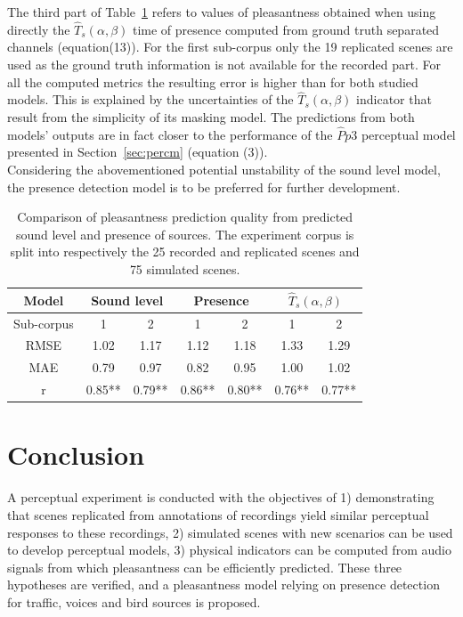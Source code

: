 \documentclass[11pt,a4paper]{article}
\begin{document}
The third part of Table~\ref{tab:pppred} refers to values of pleasantness obtained when using directly the $\hat T_s(\alpha, \beta)$ time of presence computed from ground truth separated channels (equation(13)). For the first sub-corpus only the 19 replicated scenes are used as the ground truth information is not available for the recorded part. For all the computed metrics the resulting error is higher than for both studied models. This is explained by the uncertainties of the $\hat T_s(\alpha, \beta)$ indicator that result from the simplicity of its masking model. The predictions from both models' outputs are in fact closer to the performance of the $\hat Pp3$ perceptual model presented in Section~\ref{sec:percm} (equation (3)).\\

Considering the abovementioned potential unstability of the sound level model, the presence detection model is to be preferred for further development.

\begin{table}[t]
\centering
\caption{Comparison of pleasantness prediction quality from predicted sound level and presence of sources. The experiment corpus is split into respectively the 25 recorded and replicated scenes and 75 simulated scenes.}
\label{tab:pppred}
\begin{tabular}{ c | c c | c c | c c }
\hline
	Model & \multicolumn{2}{|c}{Sound level} & \multicolumn{2}{|c}{Presence} & \multicolumn{2}{|c}{$\hat T_s(\alpha, \beta)$} \\ \hline
	Sub-corpus & 1 & 2 & 1 & 2 & 1 & 2 \\ \hline
	RMSE & 1.02 & 1.17 & 1.12 & 1.18 & 1.33 & 1.29 \\
	MAE & 0.79 & 0.97 & 0.82 & 0.95 & 1.00 & 1.02 \\ \hline
	r & 0.85** & 0.79** & 0.86** & 0.80** & 0.76** & 0.77** \\ \hline
\end{tabular}
\end{table}




\section{Conclusion}

A perceptual experiment is conducted with the objectives of 1) demonstrating that scenes replicated from annotations of recordings yield similar perceptual responses to these recordings, 2) simulated scenes with new scenarios can be used to develop perceptual models, 3) physical indicators can be computed from audio signals from which pleasantness can be efficiently predicted. These three hypotheses are verified, and a pleasantness model relying on presence detection for traffic, voices and bird sources is proposed.\\
\end{document}
